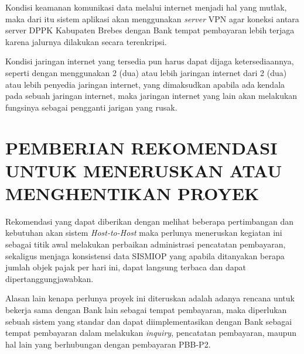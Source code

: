 \documentclass[pdftex, 12pt, oneside]{article}
\begin{document}
Kondisi keamanan komunikasi data melalui internet menjadi hal yang mutlak, maka dari itu sistem aplikasi akan menggunakan \textit{server} VPN agar koneksi antara server DPPK Kabupaten Brebes dengan Bank tempat pembayaran lebih terjaga karena jalurnya dilakukan secara terenkripsi.

Kondisi jaringan internet yang tersedia pun harus dapat dijaga ketersediaannya, seperti dengan menggunakan 2 (dua) atau lebih jaringan internet dari 2 (dua) atau lebih penyedia jaringan internet, yang dimaksudkan apabila ada kendala pada sebuah jaringan internet, maka jaringan internet yang lain akan melakukan fungsinya sebagai pengganti jarigan yang rusak.


\section{PEMBERIAN REKOMENDASI UNTUK MENERUSKAN ATAU MENGHENTIKAN PROYEK}

Rekomendasi yang dapat diberikan dengan melihat beberapa pertimbangan dan kebutuhan akan sistem \textit{Host-to-Host} maka perlunya meneruskan kegiatan ini sebagai titik awal melakukan perbaikan administrasi pencatatan pembayaran, sekaligus menjaga konsistensi data SISMIOP yang apabila ditanyakan berapa jumlah objek pajak per hari ini, dapat langsung terbaca dan dapat dipertanggungjawabkan.

Alasan lain kenapa perlunya proyek ini diteruskan adalah adanya rencana untuk bekerja sama dengan Bank lain sebagai tempat pembayaran, maka diperlukan sebuah sistem yang standar dan dapat diimplementasikan dengan Bank sebagai tempat pembayaran dalam melakukan \textit{inquiry}, pencatatan pembayaran, maupun hal lain yang berhubungan dengan pembayaran PBB-P2.
\end{document}
